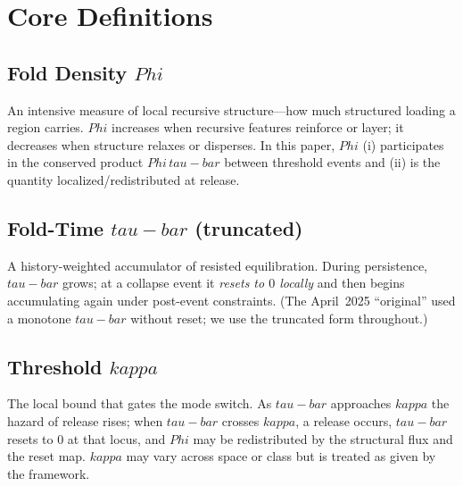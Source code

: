 \documentclass[12pt]{article}
\newcommand{\FoldDensity}{\Phi}
\newcommand{\FoldTime}{\bar{\tau}}
\newcommand{\Threshold}{\kappa}
\newcommand{\Survival}{S}
\newcommand{\Release}{R}
\newcommand{\SRF}{\mathcal{F}_{\mathrm{SR}}}
\def\FoldDensity{Phi}%
\def\FoldTime{tau-bar}%
\def\Threshold{kappa}%
\def\SRF{SRF}%
\def\Survival{S}%
\def\Release{R}%
\def\bar#1{#1}%
\def\mathcal#1{#1}%
\def\mathrm#1{#1}%
\begin{document}

\makeatletter
{}
\makeatother
\providecommand{\FoldDensity}{\Phi}
\providecommand{\FoldTime}{\bar{\tau}}
\providecommand{\Threshold}{\kappa}
\providecommand{\Survival}{S}
\providecommand{\Release}{R}
\providecommand{\SRF}{\mathcal{F}_{\mathrm{SR}}}

\section{Core Definitions}

\subsection[Fold Density (Phi)]{Fold Density $\FoldDensity$}
An intensive measure of local recursive structure—how much structured loading a region carries.
$\FoldDensity$ increases when recursive features reinforce or layer; it decreases when structure relaxes or disperses.
In this paper, $\FoldDensity$ (i) participates in the conserved product $\FoldDensity\,\FoldTime$ between threshold events and
(ii) is the quantity localized/redistributed at release.

\subsection[Fold-Time (tau-bar), truncated]{Fold-Time $\FoldTime$ (truncated)}
A history-weighted accumulator of resisted equilibration.
During persistence, $\FoldTime$ grows; at a collapse event it \emph{resets to $0$ locally} and then begins accumulating again under post-event constraints.
(The April~2025 “original” used a monotone $\FoldTime$ without reset; we use the truncated form throughout.)

\subsection[Threshold (kappa)]{Threshold $\Threshold$}
The local bound that gates the mode switch.
As $\FoldTime$ approaches $\Threshold$ the hazard of release rises; when $\FoldTime$ crosses $\Threshold$, a release occurs,
$\FoldTime$ resets to $0$ at that locus, and $\FoldDensity$ may be redistributed by the structural flux and the reset map.
$\Threshold$ may vary across space or class but is treated as given by the framework.
\end{document}
